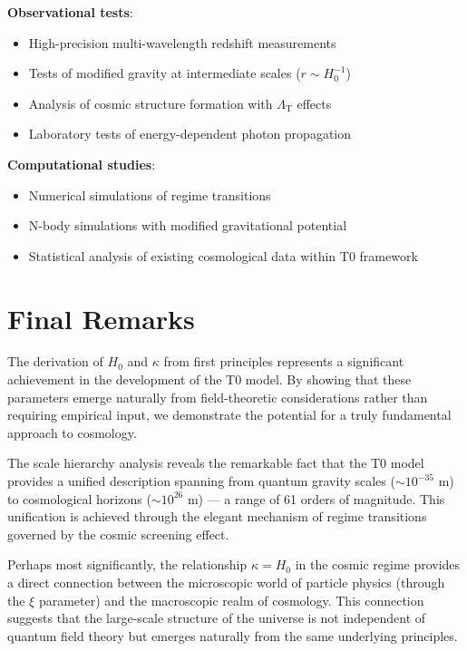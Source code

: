 \documentclass[12pt,a4paper]{article}
\newcommand{\LambdaT}{\Lambda_{\text{T}}}
\newcommand{\Hzero}{H_0}
\begin{document}
	\textbf{Observational tests}:
	\begin{itemize}
		\item High-precision multi-wavelength redshift measurements
		\item Tests of modified gravity at intermediate scales ($r \sim \Hzero^{-1}$)
		\item Analysis of cosmic structure formation with $\LambdaT$ effects
		\item Laboratory tests of energy-dependent photon propagation
	\end{itemize}
	
	\textbf{Computational studies}:
	\begin{itemize}
		\item Numerical simulations of regime transitions
		\item N-body simulations with modified gravitational potential
		\item Statistical analysis of existing cosmological data within T0 framework
	\end{itemize}
	
	\section{Final Remarks}
	\label{sec:final_remarks}
	
	The derivation of $H_0$ and $\kappa$ from first principles represents a significant achievement in the development of the T0 model. By showing that these parameters emerge naturally from field-theoretic considerations rather than requiring empirical input, we demonstrate the potential for a truly fundamental approach to cosmology.
	
	The scale hierarchy analysis reveals the remarkable fact that the T0 model provides a unified description spanning from quantum gravity scales ($\sim 10^{-35}$ m) to cosmological horizons ($\sim 10^{26}$ m) — a range of 61 orders of magnitude. This unification is achieved through the elegant mechanism of regime transitions governed by the cosmic screening effect.
	
	Perhaps most significantly, the relationship $\kappa = H_0$ in the cosmic regime provides a direct connection between the microscopic world of particle physics (through the $\xi$ parameter) and the macroscopic realm of cosmology. This connection suggests that the large-scale structure of the universe is not independent of quantum field theory but emerges naturally from the same underlying principles.
	
\end{document}
